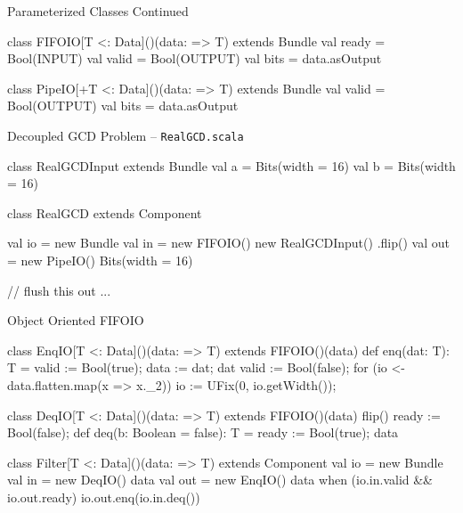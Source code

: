 \documentclass[xcolor=pdflatex,dvipsnames,table]{beamer}
\begin{document}
\begin{frame}[fragile]{Parameterized Classes Continued}
\begin{scala}
class FIFOIO[T <: Data]()(data: => T) extends Bundle {
  val ready = Bool(INPUT)
  val valid = Bool(OUTPUT)
  val bits  = data.asOutput
}

class PipeIO[+T <: Data]()(data: => T) extends Bundle {
  val valid = Bool(OUTPUT)
  val bits  = data.asOutput
}
\end{scala}
\end{frame}

\begin{frame}[fragile]{Decoupled GCD Problem -- \tt RealGCD.scala}

\begin{scala}
class RealGCDInput extends Bundle {
  val a = Bits(width = 16)
  val b = Bits(width = 16)
}

class RealGCD extends Component {
  val io  = new Bundle {
    val in  = new FIFOIO(){ new RealGCDInput() }.flip()
    val out = new PipeIO(){ Bits(width = 16) }
  }

  // flush this out ...
}
\end{scala}

\end{frame}


\begin{frame}[fragile]{Object Oriented FIFOIO}

{
\begin{scala}
class EnqIO[T <: Data]()(data: => T) extends FIFOIO()(data) {
  def enq(dat: T): T = { valid := Bool(true); data := dat; dat }
  valid := Bool(false);
  for (io <- data.flatten.map(x => x._2))
    io := UFix(0, io.getWidth());
}

class DeqIO[T <: Data]()(data: => T) extends FIFOIO()(data) {
  flip()
  ready := Bool(false);
  def deq(b: Boolean = false): T = { ready := Bool(true); data }
}

class Filter[T <: Data]()(data: => T) extends Component {
  val io = new Bundle {
    val in  = new DeqIO(){ data }
    val out = new EnqIO(){ data }
  }
  when (io.in.valid && io.out.ready) {
    io.out.enq(io.in.deq())
  }
}
\end{scala}
}

\end{frame}
\end{document}
